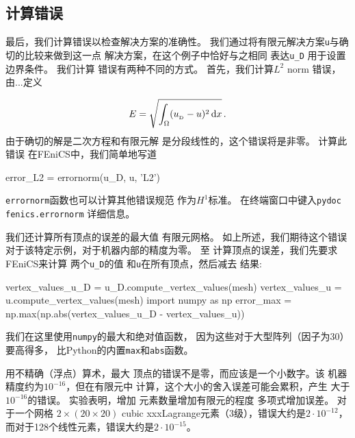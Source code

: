 
\subsection{计算错误}


最后，我们计算错误以检查解决方案的准确性。
我们通过将有限元解决方案\texttt{u}与确切的比较来做到这一点
解决方案，在这个例子中恰好与之相同
表达\verb!u_D! 用于设置边界条件。 我们计算
错误有两种不同的方式。 首先，我们计算$L^2$ norm
错误，由...定义

\[ E = \sqrt{\int_\Omega (\ub - u)^2\dx}\tp\]
由于确切的解是二次方程和有限元解
是分段线性的，这个错误将是非零。 计算此错误
在FEniCS中，我们简单地写道

\begin{python}
error_L2 = errornorm(u_D, u, 'L2')
\end{python}
\texttt{errornorm}函数也可以计算其他错误规范
作为$H^1$标准。 在终端窗口中键入\texttt{pydoc fenics.errornorm}
详细信息。

我们还计算所有顶点的误差的最大值
有限元网格。 如上所述，我们期待这个错误
对于该特定示例，对于机器内部的精度为零。 至
计算顶点的误差，我们先要求FEniCS来计算
两个\verb!u_D!的值 和\texttt{u}在所有顶点，然后减去
结果:

\begin{python}
vertex_values_u_D = u_D.compute_vertex_values(mesh)
vertex_values_u = u.compute_vertex_values(mesh)
import numpy as np
error_max = np.max(np.abs(vertex_values_u_D - vertex_values_u))
\end{python}
我们在这里使用\texttt{numpy}的最大和绝对值函数，
因为这些对于大型阵列（因子为30）要高得多，
比Python的内置\texttt{max}和\texttt{abs}函数。

\begin{notice}[如何检查错误消失]
用不精确（浮点）算术，最大
顶点的错误不是零，而应该是一个小数字。该
机器精度约为$10^{-16}$，但在有限元中
计算，这个大小的舍入误差可能会累积，产生
大于$10^{-16}$的错误。 实验表明，增加
元素数量增加有限元的程度
多项式增加误差。 对于一个网格
$2\times(20\times20)$ cubic xxxLagrange元素（3级），错误大约是$2\cdot
10^{-12}$，而对于128个线性元素，错误大约是$2\cdot
10^{-15}$。
\end{notice}
